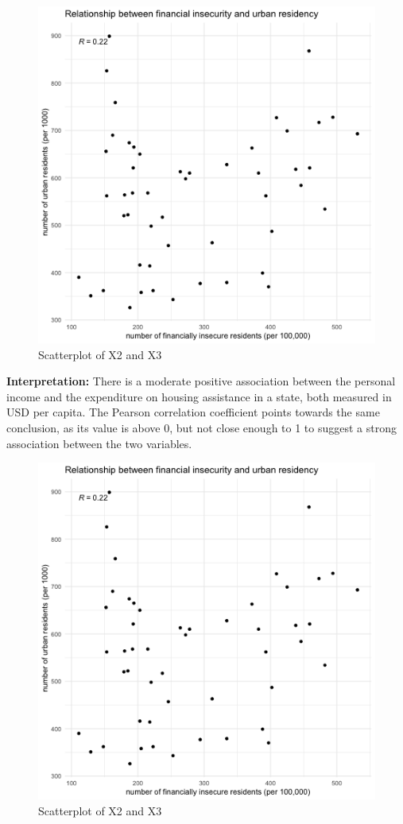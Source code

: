 \documentclass[12pt,letterpaper]{article}
\begin{document}
\begin{figure}[h!]\centering
	\caption{\footnotesize Scatterplot of X2 and X3}
	\label{fig:plot_5}
	\includegraphics[width=.95\textwidth]{scatter_x2_x3.png}
\end{figure}
\textbf{Interpretation:} There is a moderate positive association between the personal income and the expenditure on housing assistance in a state, both measured in USD per capita. The Pearson correlation coefficient points towards the same conclusion, as its value is above 0, but not close enough to 1 to suggest a strong association between the two variables. 
\newpage
\begin{figure}[h!]\centering
	\caption{\footnotesize Scatterplot of X2 and X3}
	\label{fig:plot_6}
	\includegraphics[width=.95\textwidth]{scatter_x2_x3.png}
\end{figure}
\end{document}
